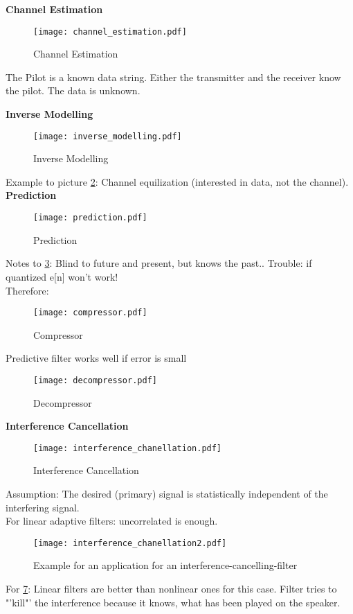 \textbf{Channel Estimation}
	\begin{figure}[H]
	\centering
	\texttt{[image: channel\_estimation.pdf]}
	\caption{Channel Estimation}
	\label{channel_estimation} 
\end{figure}
The Pilot is a known data string. Either the transmitter and the receiver know the pilot. The data is unknown.

\textbf{Inverse Modelling}
	\begin{figure}[H]
	\centering
	\texttt{[image: inverse\_modelling.pdf]}
	\caption{Inverse Modelling}
	\label{inversemodelling} 
\end{figure}
Example to picture \ref{inversemodelling}: Channel equilization (interested in data, not the channel).\\
\textbf{Prediction}
	\begin{figure}[H]
	\centering
	\texttt{[image: prediction.pdf]}
	\caption{Prediction}
	\label{prediction} 
\end{figure}
Notes to \ref{prediction}: Blind to future and present, but knows the past.. Trouble: if quantized e[n] won't work!\\
Therefore:\\
	\begin{figure}[H]
	\centering
	\texttt{[image: compressor.pdf]}
	\caption{Compressor}
	\label{compressor} 
\end{figure}
Predictive filter works well \pfeil if error is small\\
	\begin{figure}[H]
	\centering
	\texttt{[image: decompressor.pdf]}
	\caption{Decompressor}
	\label{decompressor} 
\end{figure}

\textbf{Interference Cancellation}
	\begin{figure}[H]
	\centering
	\texttt{[image: interference\_chanellation.pdf]}
	\caption{Interference Cancellation}
	\label{interference1} 
\end{figure}
Assumption: The desired (primary) signal is statistically independent of the interfering signal.\\
For linear adaptive filters: uncorrelated is enough. 
\begin{figure}[H]
	\centering
	\texttt{[image: interference\_chanellation2.pdf]}
	\caption{Example for an application for an interference-cancelling-filter}
	\label{interference2} 
\end{figure}
For \ref{interference2}: Linear filters are better than nonlinear ones for this case. Filter tries to "'kill"' the interference because it knows, what has been played on the speaker.

